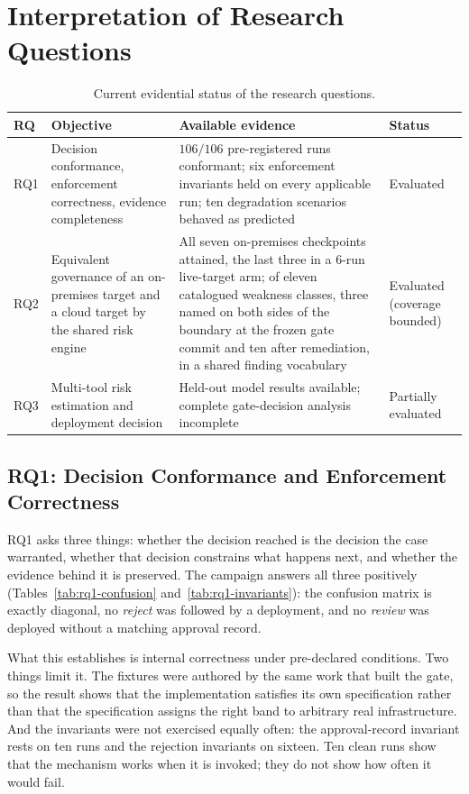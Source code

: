 \section{Interpretation of Research Questions}
\label{sec:discussion-rqs}

\begin{table}[ht]
\centering
\caption{Current evidential status of the research questions.}
\label{tab:rq-status}
\begin{tabular}{|C{1.3cm}|L{4.4cm}|L{5.3cm}|L{2.8cm}|}
\hline
\textbf{RQ} & \textbf{Objective} & \textbf{Available evidence} & \textbf{Status} \\
\hline
RQ1 & Decision conformance, enforcement correctness, evidence completeness &
$106/106$ pre-registered runs conformant; six enforcement invariants held on
every applicable run; ten degradation scenarios behaved as predicted &
Evaluated \\
\hline
RQ2 & Equivalent governance of an on-premises target and a cloud target by the
shared risk engine & All seven on-premises checkpoints attained, the last three
in a $6$-run live-target arm; of eleven catalogued weakness classes, three named
on both sides of the boundary at the frozen gate commit and ten after
remediation, in a shared finding vocabulary &
Evaluated (coverage bounded) \\
\hline
RQ3 & Multi-tool risk estimation and deployment decision & Held-out model results
available; complete gate-decision analysis incomplete & Partially evaluated \\
\hline
\end{tabular}
\end{table}

\subsection{RQ1: Decision Conformance and Enforcement Correctness}
\label{subsec:discussion-rq1}

RQ1 asks three things: whether the decision reached is the decision the case
warranted, whether that decision constrains what happens next, and whether the
evidence behind it is preserved. The campaign answers all three positively
(Tables~\ref{tab:rq1-confusion} and~\ref{tab:rq1-invariants}): the confusion
matrix is exactly diagonal, no \emph{reject} was followed by a deployment, and
no \emph{review} was deployed without a matching approval record.

What this establishes is internal correctness under pre-declared conditions. Two things
limit it. The fixtures were authored by the same work that built the gate, so
the result shows that the implementation satisfies its own specification rather
than that the specification assigns the right band to arbitrary real
infrastructure. And the invariants were not exercised equally often: the
approval-record invariant rests on ten runs and the rejection invariants on
sixteen. Ten clean runs show that the mechanism works when it is invoked; they
do not show how often it would fail.

